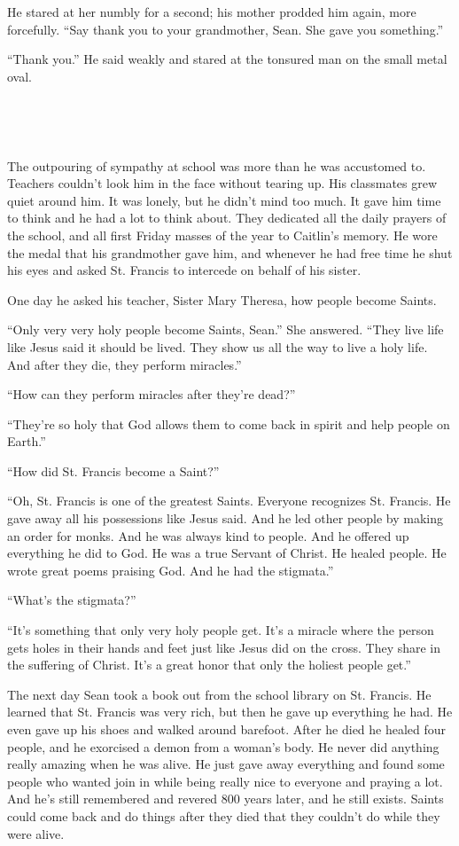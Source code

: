 \documentclass[12pt]{article}
\begin{document}
He stared at her numbly for a second; his mother prodded him again, more forcefully. “Say thank you to your grandmother, Sean. She gave you something.”

“Thank you.”  He said weakly and stared at the tonsured man on the small metal oval.

~

~

The outpouring of sympathy at school was more than he was accustomed to. Teachers couldn’t look him in the face without tearing up. 
His classmates grew quiet around him. 
It was lonely, but he didn’t mind too much. 
It gave him time to think and he had a lot to think about. 
They dedicated all the daily prayers of the school, and all first Friday masses of the year to Caitlin’s memory. 
He wore the medal that his grandmother gave him, and whenever he had free time he shut his eyes and asked St. Francis to intercede on behalf of his sister.

One day he asked his teacher, Sister Mary Theresa, how people become Saints.

“Only very very holy people become Saints, Sean.”  She answered.  “They live life like Jesus said it should be lived. They show us all the way to live a holy life. And after they die, they perform miracles.”

“How can they perform miracles after they’re dead?”

“They’re so holy that God allows them to come back in spirit and help people on Earth.” 

“How did St. Francis become a Saint?”

“Oh, St. Francis is one of the greatest Saints. Everyone recognizes St. Francis. He gave away all his possessions like Jesus said. And he led other people by making an order for monks. And he was always kind to people. And he offered up everything he did to God. He was a true Servant of Christ. He healed people.  He wrote great poems praising God. And he had the stigmata.”

“What’s the stigmata?”

“It’s something that only very holy people get. 
It’s a miracle where the person gets holes in their hands and feet just like Jesus did on the cross. 
They share in the suffering of Christ. It’s a great honor that only the holiest people get.”

The next day Sean took a book out from the school library on St. Francis. He learned that St. Francis was very rich, but then he gave up everything he had. He even gave up his shoes and walked around barefoot. After he died he healed four people, and he exorcised a demon from a woman’s body. He never did anything really amazing when he was alive. He just gave away everything and found some people who wanted join in while being really nice to everyone and praying a lot. And he’s still remembered and revered 800 years later, and he still exists. Saints could come back and do things after they died that they couldn’t do while they were alive.
\end{document}
